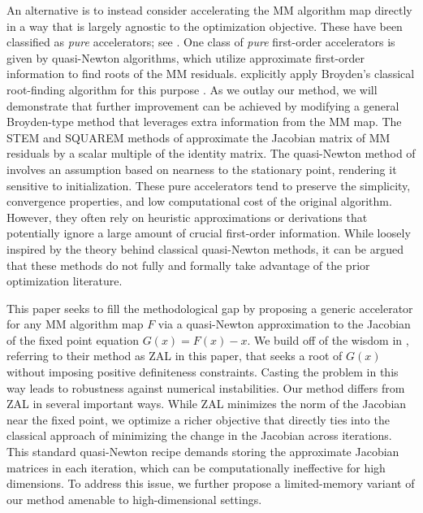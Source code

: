 \documentclass{statsoc}
\begin{document}
An alternative is to instead consider accelerating the MM algorithm map directly in a way that is largely agnostic to the optimization objective. These have been classified as \textit{pure} accelerators; see \cite{jamshidian1997acceleration}. One class of \textit{pure} first-order accelerators is given by quasi-Newton algorithms, which utilize approximate first-order information to find roots of the MM residuals. \cite{jamshidian1997acceleration} explicitly apply Broyden's classical root-finding algorithm for this purpose \citep{broyden1965class}. As we outlay our method, we will demonstrate that further improvement can be achieved by modifying a general Broyden-type method \citep{broyden1973local} that leverages extra information from the MM map. The STEM and SQUAREM methods of \cite{varadhan2008simple} approximate the Jacobian matrix of MM residuals by a scalar multiple of the identity matrix. The quasi-Newton method of \cite{zhou2011quasi} involves an assumption based on nearness to the stationary point, rendering it sensitive to initialization. These pure accelerators tend to preserve the simplicity, convergence properties, and low computational cost of the original algorithm. However, they often rely on heuristic approximations or derivations that potentially ignore a large amount of crucial first-order information. 
While loosely inspired by the theory behind classical quasi-Newton methods, it can be argued that these methods do not fully and formally take advantage of the prior optimization literature.


This paper seeks to fill the methodological gap by proposing a generic accelerator for any MM algorithm map $F$ via a quasi-Newton approximation to the Jacobian of the fixed point equation $G(x) = F(x) - x$.  We build off of the wisdom in \cite{zhou2011quasi}, referring to their  method as ZAL in this paper, that seeks a root of $G(x)$ without imposing positive definiteness constraints. Casting the problem in this way leads to robustness against numerical instabilities. Our method differs from ZAL in several important ways. While ZAL minimizes the norm of the Jacobian near the fixed point, we optimize a richer objective that directly ties into the classical approach of minimizing the change in the Jacobian across iterations. This standard quasi-Newton recipe demands storing the approximate Jacobian matrices in each iteration, which can be computationally ineffective for high dimensions. To address this issue, we further propose a limited-memory variant of our method amenable to high-dimensional settings. 
\end{document}

